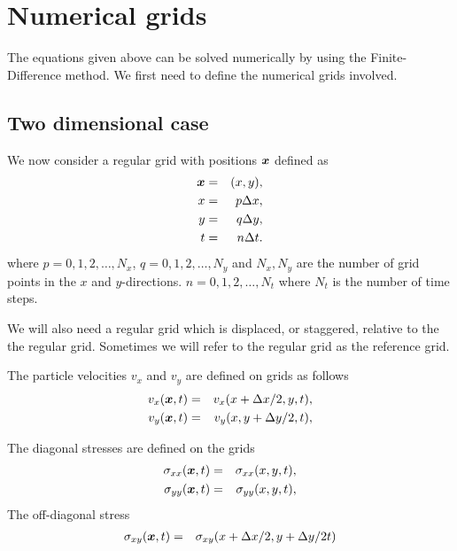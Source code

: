 \documentclass[11pt]{article}
\begin{document}
\section{Numerical grids}
The equations given above can be solved numerically by using the 
Finite-Difference method. 
We first need to define the numerical grids involved.

\subsection{Two dimensional case}

We now consider a regular grid with positions $\mbox{\boldmath $x$}$ 
defined as
\begin{eqnarray}
\mbox{\boldmath $x$} & = & (x,y),\\
x   & = & p\Delta x,\\
y   & = & q\Delta y,\\
t   & = & n\Delta t.
\end{eqnarray}
where $p=0,1,2,\ldots,N_x$, $q=0,1,2,\ldots,N_y$ and
$N_x,N_y$ are the number of grid points in the $x$ and 
$y$-directions.
$n=0,1,2,\ldots,N_t$ where $N_t$ is the number of time steps.

We will also need a regular grid which is displaced, or staggered, 
relative to the the regular grid.
Sometimes we will refer to the regular grid as the reference grid.

The particle velocities  $v_x$ and $v_y$ are defined on grids
as follows
%
\begin{eqnarray}
  v_x(\mbox{\boldmath $x$}, t) & = & v_x(x+\Delta x/2, y, t),\nonumber\\
  v_y(\mbox{\boldmath $x$}, t) & = & v_y(x, y+\Delta y/2, t),\nonumber\\
\end{eqnarray}
%


The diagonal stresses are defined on the grids
\begin{eqnarray}
  \sigma_{xx}(\mbox{\boldmath $x$}, t) & = & \sigma_{xx}( x,y,t), \nonumber\\
  \sigma_{yy}(\mbox{\boldmath $x$}, t) & = & \sigma_{yy}(x, y,t), \nonumber\\
\end{eqnarray}
The off-diagonal stress 
%
\begin{eqnarray}
  \sigma_{xy}(\mbox{\boldmath $x$}, t) & = & \sigma_{xy}(x +\Delta x/2, y+\Delta y/2t) 
                                        \nonumber\\
\end{eqnarray}
\end{document}
